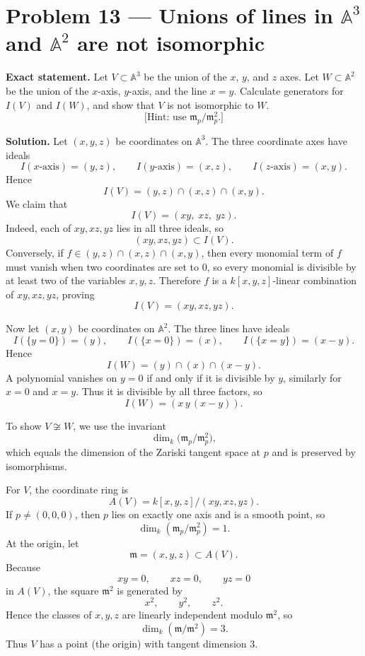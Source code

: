 \documentclass[12pt,a4paper]{article}
\theoremstyle{plain}
\theoremstyle{definition}      %
\begin{document}
\medskip

\section{Problem 13 — Unions of lines in $\mathbb A^3$ and $\mathbb A^2$ are not isomorphic}

\textbf{Exact statement.}
Let $V\subset \mathbb A^3$ be the union of the $x$, $y$, and $z$ axes.
Let $W\subset \mathbb A^2$ be the union of the $x$-axis, $y$-axis, and the line $x=y$.
Calculate generators for $I(V)$ and $I(W)$, and show that $V$ is not isomorphic to $W$.
\[
\text{[Hint: use $\mathfrak m_p/\mathfrak m_p^2$.]}
\]

\textbf{Solution.}
Let $(x,y,z)$ be coordinates on $\mathbb A^3$.
The three coordinate axes have ideals
\[
I(\text{$x$-axis})=(y,z),
\qquad
I(\text{$y$-axis})=(x,z),
\qquad
I(\text{$z$-axis})=(x,y).
\]
Hence
\[
I(V)
=
(y,z)\cap(x,z)\cap(x,y).
\]
We claim that
\[
I(V)
=
(xy,\;xz,\;yz).
\]
Indeed, each of $xy,xz,yz$ lies in all three ideals, so
\[
(xy,xz,yz)\subset I(V).
\]
Conversely, if $f\in (y,z)\cap(x,z)\cap(x,y)$, then every monomial term of $f$ must vanish when two coordinates are set to $0$,
so every monomial is divisible by at least two of the variables $x,y,z$.
Therefore $f$ is a $k[x,y,z]$-linear combination of $xy,xz,yz$, proving
\[
I(V)=(xy,xz,yz).
\]

Now let $(x,y)$ be coordinates on $\mathbb A^2$.
The three lines have ideals
\[
I(\{y=0\})=(y),
\qquad
I(\{x=0\})=(x),
\qquad
I(\{x=y\})=(x-y).
\]
Hence
\[
I(W)
=
(y)\cap(x)\cap(x-y).
\]
A polynomial vanishes on $y=0$ if and only if it is divisible by $y$, similarly for $x=0$ and $x=y$.
Thus it is divisible by all three factors, so
\[
I(W)=(x\,y\,(x-y)).
\]

To show $V\not\cong W$, we use the invariant
\[
\dim_k\bigl(\mathfrak m_p/\mathfrak m_p^2\bigr),
\]
which equals the dimension of the Zariski tangent space at $p$ and is preserved by isomorphisms.

For $V$, the coordinate ring is
\[
A(V)=k[x,y,z]/(xy,xz,yz).
\]
If $p\neq (0,0,0)$, then $p$ lies on exactly one axis and is a smooth point, so
\[
\dim_k(\mathfrak m_p/\mathfrak m_p^2)=1.
\]
At the origin, let
\[
\mathfrak m=(x,y,z)\subset A(V).
\]
Because
\[
xy=0,
\qquad
xz=0,
\qquad
yz=0
\]
in $A(V)$, the square $\mathfrak m^2$ is generated by
\[
x^2,
\qquad
y^2,
\qquad
z^2.
\]
Hence the classes of $x,y,z$ are linearly independent modulo $\mathfrak m^2$, so
\[
\dim_k(\mathfrak m/\mathfrak m^2)=3.
\]
Thus $V$ has a point (the origin) with tangent dimension $3$.
\end{document}
